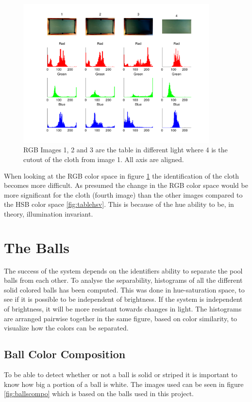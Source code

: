 \begin{figure}[H]
\begin{center}
\leavevmode
\includegraphics[width=0.9\textwidth]{images/rgb_hist_table}
\end{center}
\caption{RGB Images 1, 2 and 3 are the table in different light where 4 is the cutout of the cloth from image 1. All axis are aligned.}
\label{fig:tablergb}
\end{figure}

When looking at the RGB color space in figure \ref{fig:tablergb} the identification of the cloth becomes more difficult. As presumed the change in the RGB color space would be more significant for the cloth (fourth image) than the other images compared to the HSB color space \ref{fig:tablehsv}. This is because of the hue ability to be, in theory, illumination invariant.

\section{The Balls}
\label{sec:analballs}
The success of the system depends on the identifiers ability to separate the pool balls from each other. To analyse the separability, histograms of all the different solid colored balls has been computed. This was done in hue-saturation space, to see if it is possible to be independent of brightness. If the system is independent of brightness, it will be more resistant towards changes in light. The histograms are arranged pairwise together in the same figure, based on color similarity, to visualize how the colors can be separated.



\subsection{Ball Color Composition}
To be able to detect whether or not a ball is solid or striped it is important to know how big a portion of a ball is white. The images used can be seen in figure \ref{fig:ballscompo} which is based on the balls used in this project.


